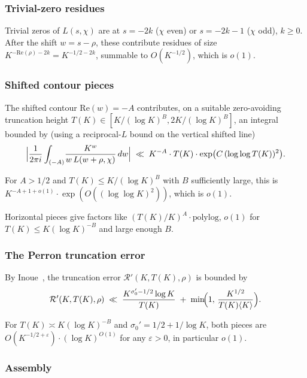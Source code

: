 \subsubsection{Trivial-zero residues}

Trivial zeros of \(L(s, \chi)\) are at \(s = -2k\) (\(\chi\) even) or
\(s = -2k - 1\) (\(\chi\) odd), \(k \ge 0\). After the shift \(w = s - \rho\),
these contribute residues of size \(K^{-\mathrm{Re}(\rho) - 2k}
= K^{-1/2 - 2k}\), summable to \(O(K^{-1/2})\), which is \(o(1)\).

\subsubsection{Shifted contour pieces}

The shifted contour \(\mathrm{Re}(w) = -A\) contributes, on a suitable
zero-avoiding truncation height \(T(K) \in [K/(\log K)^B, 2K/(\log K)^B]\), an
integral bounded by (using a reciprocal-\(L\) bound on the vertical
shifted line)
\[
\Bigl|\frac{1}{2\pi i}\int_{(-A)}\!\frac{K^w}{w\,L(w+\rho,\chi)}\,dw\Bigr|
\;\ll\;
K^{-A} \cdot T(K) \cdot \exp\bigl(C\,(\log\log T(K))^2\bigr).
\]

For \(A > 1/2\) and \(T(K) \le K/(\log K)^B\) with \(B\) sufficiently large,
this is \(K^{-A + 1 + o(1)} \cdot \exp(O((\log\log K)^2))\), which is
\(o(1)\).

Horizontal pieces give factors like \((T(K)/K)^A \cdot \mathrm{polylog}\),
\(o(1)\) for \(T(K) \le K (\log K)^{-B}\) and large enough \(B\).

\subsubsection{The Perron truncation error}

By Inoue~\cite[Theorem~1]{Inoue2021}, the truncation error
\(\mathcal{R}'(K, T(K), \rho)\) is bounded by
\[
\mathcal{R}'(K, T(K), \rho)
\;\ll\;
\frac{K^{\sigma_0' - 1/2} \log K}{T(K)}
\;+\;
\min\!\Bigl(1,\,\frac{K^{1/2}}{T(K) \langle K\rangle}\Bigr).
\]

For \(T(K) \asymp K (\log K)^{-B}\) and \(\sigma_0' = 1/2 + 1/\log K\), both
pieces are \(O(K^{-1/2 + \varepsilon}) \cdot (\log K)^{O(1)}\) for any
\(\varepsilon > 0\), in particular \(o(1)\).

\subsubsection{Assembly}

